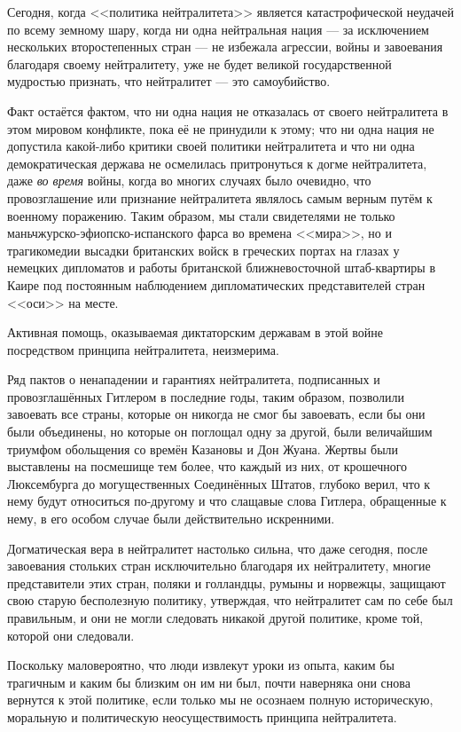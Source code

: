 Сегодня, когда <<политика нейтралитета>> является катастрофической неудачей по всему земному шару, когда ни одна нейтральная нация — за исключением нескольких второстепенных стран — не избежала агрессии, войны и завоевания благодаря своему нейтралитету, уже не будет великой государственной мудростью признать, что нейтралитет — это самоубийство.

Факт остаётся фактом, что ни одна нация не отказалась от своего нейтралитета в этом мировом конфликте, пока её не принудили к этому; что ни одна нация не допустила какой-либо критики своей политики нейтралитета и что ни одна демократическая держава не осмелилась притронуться к догме нейтралитета, даже \textit{во время} войны, когда во многих случаях было очевидно, что провозглашение или признание нейтралитета являлось самым верным путём к военному поражению. Таким образом, мы стали свидетелями не только маньчжурско-эфиопско-испанского фарса во времена <<мира>>, но и трагикомедии высадки британских войск в греческих портах на глазах у немецких дипломатов и работы британской ближневосточной штаб-квартиры в Каире под постоянным наблюдением дипломатических представителей стран <<оси>> на месте.

Активная помощь, оказываемая диктаторским державам в этой войне посредством принципа нейтралитета, неизмерима.

Ряд пактов о ненападении и гарантиях нейтралитета, подписанных и провозглашённых Гитлером в последние годы, таким образом, позволили завоевать все страны, которые он никогда не смог бы завоевать, если бы они были объединены, но которые он поглощал одну за другой, были величайшим триумфом обольщения со времён Казановы и Дон Жуана. Жертвы были выставлены на посмешище тем более, что каждый из них, от крошечного Люксембурга до могущественных Соединённых Штатов, глубоко верил, что к нему будут относиться по-другому и что слащавые слова Гитлера, обращенные к нему, в его особом случае были действительно искренними.

Догматическая вера в нейтралитет настолько сильна, что даже сегодня, после завоевания стольких стран исключительно благодаря их нейтралитету, многие представители этих стран, поляки и голландцы, румыны и норвежцы, защищают свою старую бесполезную политику, утверждая, что нейтралитет сам по себе был правильным, и они не могли следовать никакой другой политике, кроме той, которой они следовали.

Поскольку маловероятно, что люди извлекут уроки из опыта, каким бы трагичным и каким бы близким он им ни был, почти наверняка они снова вернутся к этой политике, если только мы не осознаем полную историческую, моральную и политическую неосуществимость принципа нейтралитета.

